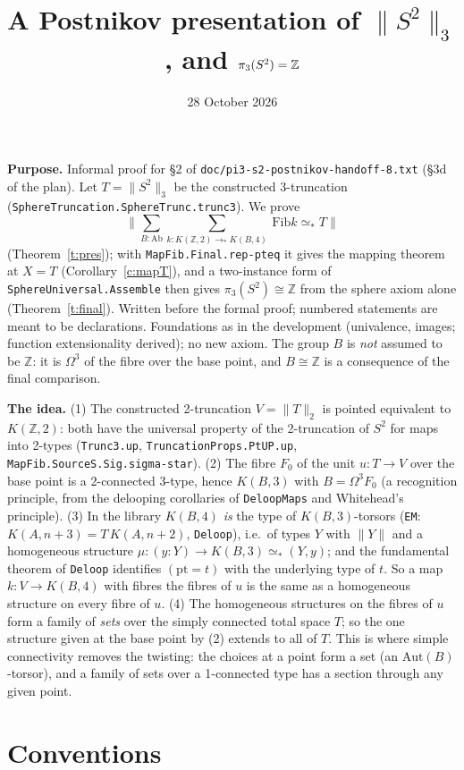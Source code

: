 \documentclass[11pt]{amsart}
\title{A Postnikov presentation of $\|S^2\|_3$, and $\pi_3(S^2)=\Z$}
\date{28 October 2026}
\theoremstyle{definition}
\theoremstyle{remark}
\newcommand{\Om}{\Omega}
\newcommand{\Z}{\mathbb{Z}}
\newcommand{\code}[1]{\texttt{#1}}
\newcommand{\Fib}{\mathrm{Fib}}
\newcommand{\tr}[1]{\|#1\|}
\begin{document}
\maketitle

\noindent\textbf{Purpose.} Informal proof for \S2 of
\code{doc/pi3-s2-postnikov-handoff-8.txt} (\S3d of the plan). Let
$T=\tr{S^2}_3$ be the constructed 3-truncation
(\code{SphereTruncation.SphereTrunc.trunc3}). We prove
\[ \tr{\textstyle\sum_{B:\mathrm{Ab}}\sum_{k:K(\Z,2)\to_*K(B,4)}\ \Fib k\simeq_*T}\]
(Theorem~\ref{t:pres}); with \code{MapFib.Final.rep-pteq} it gives the
mapping theorem at $X=T$ (Corollary~\ref{c:mapT}), and a two-instance form
of \code{SphereUniversal.Assemble} then gives $\pi_3(S^2)\cong\Z$ from the
sphere axiom alone (Theorem~\ref{t:final}). Written before the formal
proof; numbered statements are meant to be declarations. Foundations as in
the development (univalence, images; function extensionality derived); no
new axiom. The group $B$ is \emph{not} assumed to be $\Z$: it is
$\Om^3$ of the fibre over the base point, and $B\cong\Z$ is a consequence of
the final comparison.

\smallskip\noindent\textbf{The idea.} (1) The constructed 2-truncation
$V=\tr T_2$ is pointed equivalent to $K(\Z,2)$: both have the universal
property of the 2-truncation of $S^2$ for maps into 2-types
(\code{Trunc3.up}, \code{TruncationProps.PtUP.up}, \code{MapFib.SourceS.Sig.sigma-star}).
(2) The fibre $F_0$ of the unit $u:T\to V$ over the base point is a
2-connected 3-type, hence $K(B,3)$ with $B=\Om^3F_0$ (a recognition
principle, from the delooping corollaries of \code{DeloopMaps} and
Whitehead's principle). (3) In the library $K(B,4)$ \emph{is} the type of
$K(B,3)$-torsors (\code{EM}: $K(A,n{+}3)=T\,K(A,n{+}2)$, \code{Deloop}),
i.e.\ of types $Y$ with $\tr Y$ and a homogeneous structure
$\mu:(y:Y)\to K(B,3)\simeq_*(Y,y)$; and the fundamental theorem of
\code{Deloop} identifies $(\mathrm{pt}=t)$ with the underlying type of $t$.
So a map $k:V\to K(B,4)$ with fibres the fibres of $u$ is the same as a
homogeneous structure on every fibre of $u$. (4) The homogeneous
structures on the fibres of $u$ form a family of \emph{sets} over the
simply connected total space $T$; so the one structure given at the base
point by (2) extends to all of $T$. This is where simple connectivity
removes the twisting: the choices at a point form a set (an
$\mathrm{Aut}(B)$-torsor), and a family of sets over a 1-connected type has
a section through any given point.

\section{Conventions}
\end{document}
